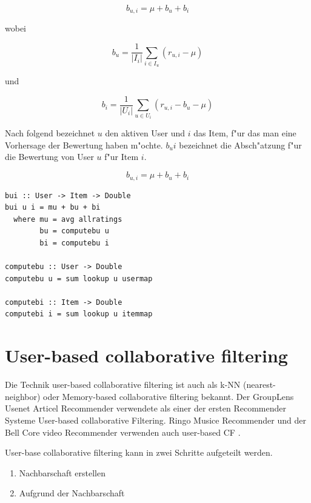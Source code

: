 \documentclass[a4paper, 11pt]{article}
\begin{document}
\begin{equation}
  \label{eq:bui}
  b_{u,i} = \mu + b_u + b_i
\end{equation}

wobei

\begin{equation}
  b_u = \frac{1}{|I_i|}\sum_{i \in I_u}(r_{u,i} - \mu)
\end{equation}

und 

\begin{equation}
  \label{eq:bi}
  b_i = \frac{1}{|U_i|}\sum_{u \in U_i}(r_{u,i} - b_u - \mu)
\end{equation}

Nach folgend bezeichnet $u$ den aktiven User und $i$ das Item, f"ur das man eine Vorhersage der Bewertung haben m"ochte. $b_ui$ bezeichnet die Absch"atzung f"ur die Bewertung von User $u$ f"ur Item $i$.

\begin{equation}
  \label{eq:baseline}
  b_{u,i} = \mu + b_u + b_i
\end{equation}

\begin{lstlisting}[caption=Baseline predictor, label=lst:baseline]
bui :: User -> Item -> Double
bui u i = mu + bu + bi
  where mu = avg allratings
        bu = computebu u
        bi = computebu i

computebu :: User -> Double
computebu u = sum lookup u usermap

computebi :: Item -> Double
computebi i = sum lookup u itemmap
\end{lstlisting}


\section{User-based collaborative filtering}

Die Technik user-based collaborative filtering ist auch als k-NN (nearest-neighbor) oder Memory-based collaborative filtering bekannt. Der GroupLens Usenet Articel Recommender verwendete als einer der ersten Recommender Systeme User-based collaborative Filtering. Ringo Musice Recommender und der Bell Core video Recommender verwenden auch user-based CF .

User-base collaborative filtering kann in zwei Schritte aufgeteilt werden. 

\begin{enumerate}
\item Nachbarschaft erstellen
\item Aufgrund der Nachbarschaft 
\end{enumerate}
\end{document}
